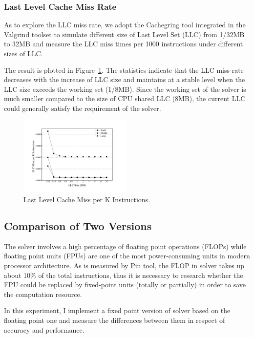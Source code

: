 \subsubsection{Last Level Cache Miss Rate}
As to explore the LLC miss rate, we adopt the Cachegring tool integrated in the Valgrind toolset to simulate different size of Last Level Set (LLC) from 1/32MB to 32MB and measure the LLC miss times per 1000 instructions under different sizes of LLC.

The result is plotted in Figure~\ref{fig:LLC_miss}. The statistics indicate that the LLC miss rate decreases with the increase of LLC size and maintains at a stable level when the LLC size exceeds the working set (1/8MB). Since the working set of the solver is much smaller compared to the size of CPU shared LLC (8MB), the current LLC could generally satisfy the requirement of the solver.
\begin{figure}[ht]
\centering
\includegraphics[width=0.50\textwidth]{graph/LLC_miss.pdf}
\caption{Last Level Cache Miss per K Instructions.}
\label{fig:LLC_miss}
\end{figure}

\subsection{Comparison of Two Versions}
\label{sec:comparison}

The \SA solver involves a high percentage of floating point operations (FLOPs) while floating point units (FPUs) are one of the most power-consuming units in modern processor architecture. As is measured by Pin tool, the FLOP in \SA solver takes up about 10\% of the total instructions, thus it is necessary to research whether the FPU could be replaced by fixed-point units (totally or partially) in order to save the computation resource.

In this experiment, I implement a fixed point version of \SA solver based on the floating point one and measure the differences between them in respect of accuracy and performance.

